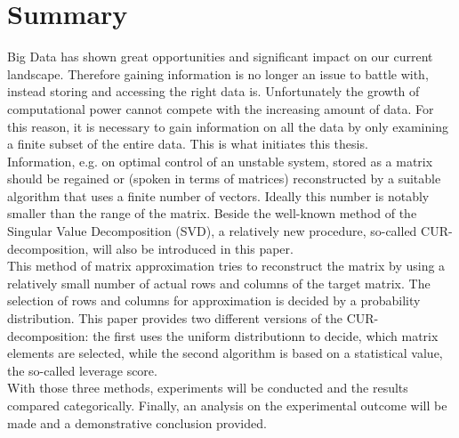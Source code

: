 \documentclass[12pt,a4paper,twoside]{article}
\begin{document}
\section*{Summary}
Big Data has shown great opportunities and significant impact on our current landscape. Therefore gaining information is no longer an issue to battle with, instead storing and accessing the right data is. Unfortunately the growth of computational power cannot compete with the increasing amount of data. For this reason, it is necessary to gain information on all the data by only examining a finite subset of the entire data. This is what initiates this thesis. \\
Information, e.g. on optimal control of an unstable system, stored as a matrix should be regained or (spoken in terms of matrices) reconstructed by a suitable algorithm that uses a finite number of vectors. Ideally this number is notably smaller than the range of the matrix. Beside the well-known method of the Singular Value Decomposition (SVD), a relatively new procedure, so-called CUR-decomposition, will also be introduced in this paper.
\\
This method of matrix approximation tries to reconstruct the matrix by using a relatively small number of actual rows and columns of the target matrix. The selection of rows and columns for approximation is decided by a probability distribution. This paper provides two different versions of the CUR-decomposition: the first uses the uniform distributionn to decide, which matrix elements are selected, while the second algorithm is based on a statistical value, the so-called leverage score. \\
With those three methods, experiments will be conducted and the results compared categorically.
Finally, an analysis on the experimental outcome will be made and a demonstrative conclusion provided.
\newpage
\tableofcontents
\newpage

\pagestyle{headings}
\end{document}
